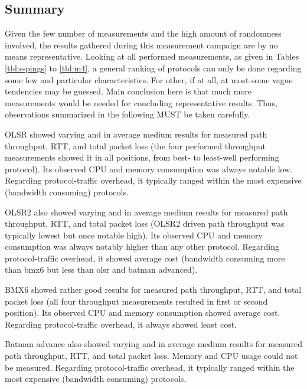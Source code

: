 \documentclass[a4paper,12pt,twoside]{article}
\begin{document}
%

\clearpage



\subsection{Summary}
Given the few number of measurements and the high amount of randomness
involved, the results gathered during this measurement campaign are by
no means representative. Looking at all performed measurements, as given
in Tables \ref{tbl:s-pings} to \ref{tbl:m4}, a general ranking of
protocols can only be done regarding some few and particular
characteristics. For other, if at all, at most some vague tendencies
may be guessed. Main conclusion here is that much more measurements
would be needed for concluding representative results.  Thus,
observations summarized in the following MUST be taken carefully.

OLSR showed varying and in average medium results for measured path
throughput, RTT, and total packet loss (the four performed throughput
measurements showed it in all positions, from best- to least-well
performing protocol). Its observed CPU and memory consumption was
always notable low.  Regarding protocol-traffic overhead, it typically
ranged within the most expensive (bandwidth consuming) protocols.

OLSR2 also showed varying and in average medium results for measured
path throughput, RTT, and total packet loss (OLSR2 driven path
throughput was typically lowest but once notable high). Its observed
CPU and memory consumption was always notably higher than any other
protocol.  Regarding protocol-traffic overhead, it showed average cost
(bandwidth consuming more than bmx6 but less than olsr and batman advanced).

BMX6 showed rather good results for measured path throughput, RTT, and
total packet loss (all four throughput measurements resulted in first
or second position). Its observed CPU and memory consumption showed
average cost.  Regarding protocol-traffic overhead, it always showed
least cost.

Batman advance also showed varying and in average medium results for
measured path throughput, RTT, and total packet loss. Memory and CPU
usage could not be measured. Regarding protocol-traffic overhead, it
typically ranged within the most expensive (bandwidth consuming)
protocols.
\end{document}
